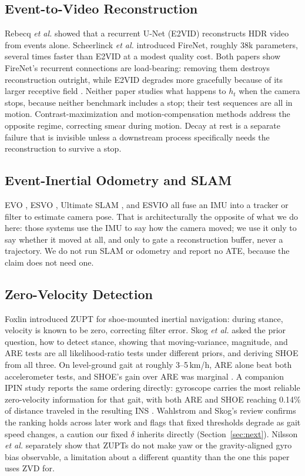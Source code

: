 \documentclass[journal]{IEEEtran}
\begin{document}
\subsection{Event-to-Video Reconstruction}
Rebecq \textit{et al.} \cite{rebecq2021} showed that a recurrent U-Net (E2VID)
reconstructs HDR video from events alone. Scheerlinck \textit{et al.}
\cite{scheerlinck2020} introduced FireNet, roughly 38k parameters, several times
faster than E2VID at a modest quality cost. Both papers show FireNet's recurrent
connections are load-bearing: removing them destroys reconstruction outright,
while E2VID degrades more gracefully because of its larger receptive field
\cite{scheerlinck2020}. Neither paper studies what happens to \(h_t\) when the
camera stops, because neither benchmark includes a stop; their test sequences
are all in motion. Contrast-maximization and motion-compensation methods
\cite{gallego2022} address the opposite regime, correcting smear during motion.
Decay at rest is a separate failure that is invisible unless a downstream
process specifically needs the reconstruction to survive a stop.

\subsection{Event-Inertial Odometry and SLAM}
EVO \cite{rebecq2017evo}, ESVO \cite{zhou2021}, Ultimate SLAM \cite{vidal2018},
and ESVIO \cite{chen2023} all fuse an IMU into a tracker or filter to estimate
camera pose. That is architecturally the opposite of what we do here: those
systems use the IMU to say how the camera moved; we use it only to say whether
it moved at all, and only to gate a reconstruction buffer, never a trajectory.
We do not run SLAM or odometry and report no ATE, because the claim does not
need one.

\subsection{Zero-Velocity Detection}
Foxlin \cite{foxlin2005} introduced ZUPT for shoe-mounted inertial navigation:
during stance, velocity is known to be zero, correcting filter error. Skog
\textit{et al.} \cite{skog2010tbe} asked the prior question, how to detect
stance, showing that moving-variance, magnitude, and ARE tests are all
likelihood-ratio tests under different priors, and deriving SHOE from all three.
On level-ground gait at roughly 3--5\,km/h, ARE alone beat both accelerometer
tests, and SHOE's gain over ARE was marginal \cite{skog2010tbe}. A companion
IPIN study reports the same ordering directly: gyroscope carries the most
reliable zero-velocity information for that gait, with both ARE and SHOE
reaching 0.14\% of distance traveled in the resulting INS \cite{skog2010ipin}.
Wahlstrom and Skog's review \cite{wahlstrom2021} confirms the ranking holds
across later work and flags that fixed thresholds degrade as gait speed changes,
a caution our fixed \(\delta\) inherits directly (Section~\ref{sec:next}).
Nilsson \textit{et al.} \cite{nilsson2012} separately show that ZUPTs do not
make yaw or the gravity-aligned gyro bias observable, a limitation about a
different quantity than the one this paper uses ZVD for.
\end{document}
